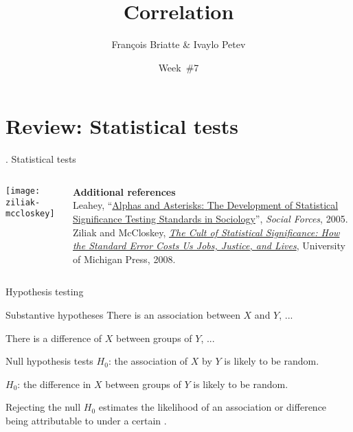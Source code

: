 \documentclass[t]{beamer}
\title{Correlation}
\author{François Briatte \& Ivaylo Petev}
\date{Week~\#7}
\begin{document}
	
    \frame[plain]{
		\titlepage\\[7em]
		\tableofcontents[hideallsubsections]
		}


	\section{Review: Statistical tests}
	
	\begin{frame}[c]{\thesection. Statistical tests}
		
		\vfill
		 
		\begin{columns}[T]
			
			\texttt{[image: ziliak-mccloskey]}

			
			\footnotesize{%
			\textbf{Additional references}\\[1em]%
			Leahey, ``\href{http://sf.oxfordjournals.org/content/84/1/1}{Alphas and Asterisks: The Development of Statistical Significance Testing Standards in Sociology}'', \emph{Social Forces}, 2005.\\[1em]%
			Ziliak and McCloskey, \emph{\href{http://www.press.umich.edu/titleDetailDesc.do?id=186351}{The Cult of Statistical Significance: How the Standard Error Costs Us Jobs, Justice, and Lives}}, University of Michigan Press, 2008.%
			}
		\end{columns}
	\end{frame}
	
	
	\begin{frame}{Hypothesis testing}
		 
		\begin{block}{Substantive hypotheses}
			There is an association between $X$ and $Y$, ...
			
			There is a difference of $X$ between groups of $Y$, ...
		\end{block}
		
		\begin{block}{Null hypothesis tests}
			$H_0$: the association of $X$ by $Y$ is likely to be random.

			$H_0$: the difference in $X$ between groups of $Y$ is likely to be random.
		\end{block}
		
		\begin{alertblock}{Rejecting the null}
			$H_0$ estimates the likelihood of an association or difference being attributable to  under a certain .
		\end{alertblock}
		
	\end{frame}
\end{document}
